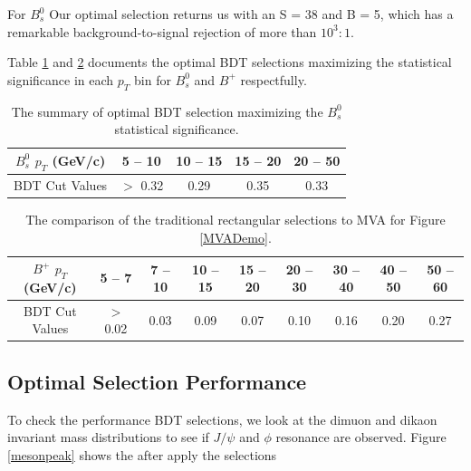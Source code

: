 For $B^0_s$  Our optimal selection returns us with an S = 38 and B = 5, which has a remarkable background-to-signal rejection of more than $10^3 : 1$.



Table \ref{BsSig} and \ref{BPSig} documents the optimal BDT selections maximizing the statistical significance in each $p_T$ bin for $B^0_s$ and $B^+$ respectfully.

\begin{table}[h]
\begin{center}
\caption{The summary of optimal BDT selection maximizing the $B^0_s$ statistical significance.}
\vspace{1em}
\label{BsSig}
  \begin{tabular}{ |c | c| c| c| c|}
    \hline 
$B^0_s$ $p_T$ (GeV/c) & 5 -- 10 & 10 -- 15 & 15 -- 20 &  20 -- 50\\
     \hline
 BDT Cut Values & $>$ 0.32 & 0.29  & 0.35 & 0.33  \\
     \hline
    \hline
\end{tabular}
\end{center}
\end{table}

\begin{table}[h]
\begin{center}
\caption{The comparison of the traditional rectangular selections to MVA for Figure \ref{MVADemo}.}
\vspace{1em}
\label{BPSig}
  \begin{tabular}{ |c | c| c| c| c| c| c| c| c|}
    \hline 
$B^+$ $p_T$ (GeV/c) & 5 -- 7 & 7 -- 10 & 10 -- 15 & 15 -- 20 & 20 -- 30 & 30 -- 40 & 40 -- 50 & 50 -- 60\\
     \hline
 BDT Cut Values & $>$ 0.02  & 0.03  & 0.09 & 0.07  & 0.10 & 0.16 & 0.20 & 0.27  \\
     \hline
    \hline
\end{tabular}
\end{center}
\end{table}


\subsection{Optimal Selection Performance}

To check the performance BDT selections, we look at the dimuon and dikaon invariant mass distributions to see if $J/\psi$ and $\phi$ resonance are observed. Figure \ref{mesonpeak} shows the after apply the selections


